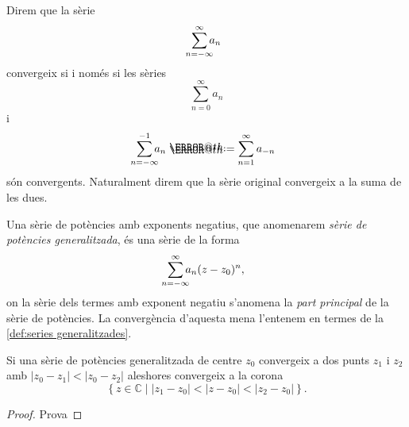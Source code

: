 \documentclass[12pt,twoside]{report}
\makeatletter
\numberwithin{table}{section}
\numberwithin{equation}{section}
\numberwithin{figure}{section}
\newcommand{\C}{\ensuremath{\mathbb{C}}}
\newcommand{\set}[2]{\left\{ #1 \mid #2 \right\}}
\newcommand{\abs}[1]{\left\lvert #1 \right\rvert}
\newcommand*{\defeq}{\mathrel{\rlap{%
    \raisebox{0.3ex}{$\m@th\cdot$}}%
  \raisebox{-0.3ex}{$\m@th\cdot$}}%
	=
}
\makeatother
\begin{document}
\begin{defn}\label{def:series generalitzades}
	Direm que la sèrie \[ \sum_{\mathclap{n = -\infty}}^{\infty}a_n  \] convergeix si i només si les sèries \[ \sum_{n = 0}^{\infty}a_n \] i \[ \sum_{\mathclap{n = -\infty}}^{-1}a_n \defeq \sum_{n = 1}^{\infty}a_{-n} \] són convergents. Naturalment direm que la sèrie original convergeix a la suma de les dues. 
\end{defn}

\begin{defn}
	Una sèrie de potències amb exponents negatius, que anomenarem \emph{sèrie de potències generalitzada}, és una sèrie de la forma
	\begin{equation*}
		\sum_{\mathclap{n = -\infty}}^{\infty} a_n(z - z_0)^n, 
	\end{equation*}
	on la sèrie dels termes amb exponent negatiu s'anomena la \emph{part principal} de la sèrie de potències. La convergència d'aquesta mena l'entenem en termes de la \cref{def:series generalitzades}.
\end{defn}

\begin{prop}
	Si una sèrie de potències generalitzada de centre \( z_0 \) convergeix a dos punts \( z_1 \) i \( z_2 \) amb \( \abs{z_0 - z_1} < \abs{z_0 - z_2} \) aleshores convergeix a la corona
	\begin{equation*}
		\set{z \in \C}{\abs{z_1 - z_0} < \abs{z - z_0} < \abs{z_2 - z_0}}.
	\end{equation*}
\end{prop}
\begin{proof}
	Prova
\end{proof}
\end{document}
